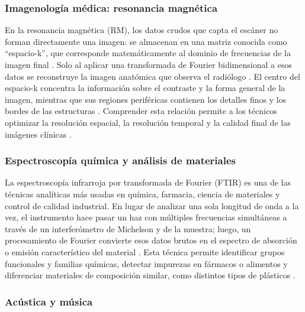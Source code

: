 \subsubsection{Imagenología médica: resonancia magnética}

En la resonancia magnética (RM), los datos crudos que capta el escáner no forman directamente una imagen: se almacenan en una matriz conocida como ``espacio-k'', que corresponde matemáticamente al dominio de frecuencias de la imagen final \cite{sciencedirect:espacio-k,arxiv:mri-reconstruccion}. Solo al aplicar una transformada de Fourier bidimensional a esos datos se reconstruye la imagen anatómica que observa el radiólogo \cite{sciencedirect:espacio-k}. El centro del espacio-k concentra la información sobre el contraste y la forma general de la imagen, mientras que sus regiones periféricas contienen los detalles finos y los bordes de las estructuras \cite{upv:espacio-k-completo}. Comprender esta relación permite a los técnicos optimizar la resolución espacial, la resolución temporal y la calidad final de las imágenes clínicas \cite{sciencedirect:espacio-k}.

\subsubsection{Espectroscopía química y análisis de materiales}

La espectroscopía infrarroja por transformada de Fourier (FTIR) es una de las técnicas analíticas más usadas en química, farmacia, ciencia de materiales y control de calidad industrial. En lugar de analizar una sola longitud de onda a la vez, el instrumento hace pasar un haz con múltiples frecuencias simultáneas a través de un interferómetro de Michelson y de la muestra; luego, un procesamiento de Fourier convierte esos datos brutos en el espectro de absorción o emisión característico del material \cite{wikipedia:ftir-en,wikipedia:ftir-es}. Esta técnica permite identificar grupos funcionales y familias químicas, detectar impurezas en fármacos o alimentos y diferenciar materiales de composición similar, como distintos tipos de plásticos \cite{udg:ftir-cucei,tecnosoluciones:ftir-industria}.

\subsubsection{Acústica y música}

